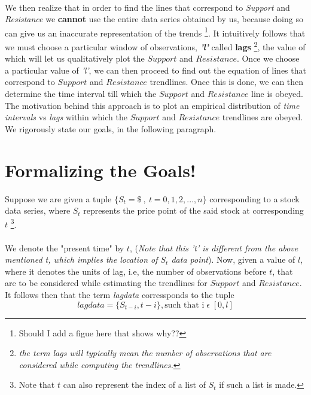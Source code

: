 \documentclass[letterpaper, 12pt] {article}
\begin{document}
	\paragraph{}
	We then realize that in order to find the lines that correspond to \textit{Support} and \textit{Resistance} we \textbf{cannot} use the entire data series obtained by us, because doing so can give us an inaccurate representation of the trends \footnote{Should I add a figue here that shows why??}. It intuitively follows that we must choose a particular window of observations, \textbf{\textit{'l'}} called \textbf{lags} \footnote{\textit{the term lags will typically mean the number of observations that are considered while computing the trendlines.}}, the value of which will let us qualitatively plot the $Support$ and $Resistance$. Once we choose a particular value of \textit{'l'}, we can then proceed to find out the equation of lines that correspond to $Support$ and $Resistance$ trendlines. Once this is done, we can then determine the time interval till which the $Support$ and $Resistance$ line is obeyed. The motivation behind this approach is to plot an empirical distribution of \textit{time intervals} vs \textit{lags} within which the $Support$ and $Resistance$ trendlines are obeyed. \linebreak
	We rigorously state our goals, in the following paragraph.
	
	
	\section{Formalizing the Goals!}
	Suppose we are given a tuple $\{S_t = \$\ ,\ t = 0, 1,2, ..., n\}$ corresponding to a stock data series, where $S_t$ represents the price point of the said stock at corresponding $t$ \footnote{Note that $t$ can also represent the index of a list of $S_t$ if such a list is made.}. 
	\paragraph{}
	We denote the "present time" by $t$, (\textit{Note that this 't' is different from the above mentioned t, which implies the location of $S_t$ data point}). Now, given a value of $l$, where it denotes the units of lag, i.e, the number of observations before $t$, that are to be considered while estimating the trendlines for $Support$ and $Resistance$. It follows then that the term \textit{lagdata} corressponds to the tuple
	\begin{equation*}
	lagdata = \{S_{t-i}, t-i\}, \text{such that i} \; \epsilon \;[0, l]
	\end{equation*} 
	
\end{document}
